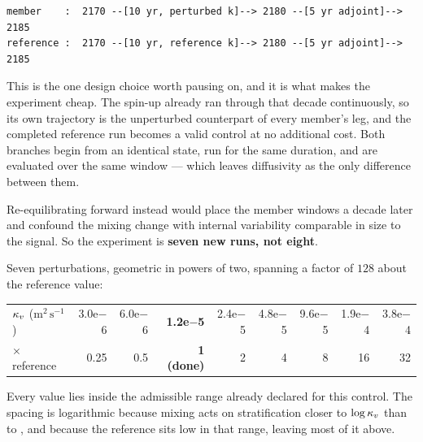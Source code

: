 \smallskip
\begin{center}
\footnotesize
\begin{verbatim}
member    :  2170 --[10 yr, perturbed k]--> 2180 --[5 yr adjoint]--> 2185
reference :  2170 --[10 yr, reference k]--> 2180 --[5 yr adjoint]--> 2185
\end{verbatim}
\end{center}
\smallskip

This is the one design choice worth pausing on, and it is what makes the
experiment cheap. The spin-up already ran through that decade continuously, so
its own trajectory is the unperturbed counterpart of every member's leg, and the
completed reference run becomes a valid control at no additional cost. Both
branches begin from an identical state, run for the same duration, and are
evaluated over the same window --- which leaves diffusivity as the only
difference between them.

Re-equilibrating forward instead would place the member windows a decade later
and confound the mixing change with internal variability comparable in size to
the signal. So the experiment is \textbf{seven new runs, not eight}.

Seven perturbations, geometric in powers of two, spanning a factor of $128$
about the reference value:

\smallskip
\begin{center}
\footnotesize
\begin{tabular}{l*{8}{r}}
\toprule
$\kappa_{v}$ ($\mathrm{m^{2}\,s^{-1}}$)
 & 3.0e$-$6 & 6.0e$-$6 & \textbf{1.2e$-$5} & 2.4e$-$5
 & 4.8e$-$5 & 9.6e$-$5 & 1.9e$-$4 & 3.8e$-$4\\
$\times$ reference
 & 0.25 & 0.5 & \textbf{1 (done)} & 2 & 4 & 8 & 16 & 32\\
\bottomrule
\end{tabular}
\end{center}
\smallskip

Every value lies inside the admissible range already declared for this control.
The spacing is logarithmic because mixing acts on stratification closer to
$\log\kappa_{v}$ than to \kv, and because the reference sits low in that range, leaving
most of it above.
